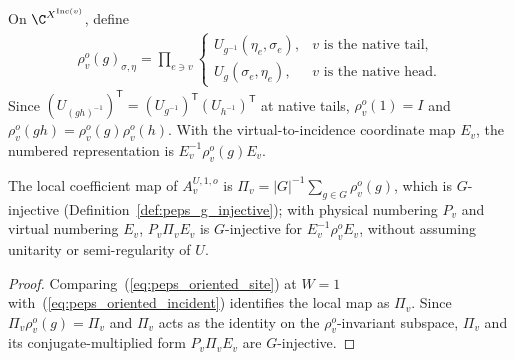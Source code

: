 \begin{definition}%
    \label{def:peps_oriented_incident_representation}
    \leanok
    On $\C^{X^{\operatorname{Inc}(v)}}$, define
    \begin{align}
        \rho_v^o(g)_{\sigma,\eta}
        =\prod_{e\ni v}
        \begin{cases}
            U_{g^{-1}}(\eta_e,\sigma_e), & v\text{ is the native tail}, \\
            U_g(\sigma_e,\eta_e),        & v\text{ is the native head}.
        \end{cases}
        \label{eq:peps_oriented_incident}
    \end{align}
    Since $(U_{(gh)^{-1}})^{\mathsf T}=(U_{g^{-1}})^{\mathsf T}(U_{h^{-1}})^{\mathsf T}$
    at native tails, $\rho_v^o(1)=I$ and $\rho_v^o(gh)=\rho_v^o(g)\rho_v^o(h)$.
    With the virtual-to-incidence coordinate map $E_v$, the numbered
    representation is $E_v^{-1}\rho_v^o(g)E_v$.
\end{definition}

\begin{lemma}%
    \label{thm:peps_oriented_average_g_injective}
    \leanok
    The local coefficient map of $A^{U,1,o}_v$ is
    $\Pi_v=|G|^{-1}\sum_{g\in G}\rho_v^o(g)$, which is $G$-injective
    (Definition~\ref{def:peps_g_injective}); with physical numbering $P_v$ and
    virtual numbering $E_v$, $P_v\Pi_v E_v$ is $G$-injective for
    $E_v^{-1}\rho_v^o E_v$, without assuming unitarity or semi-regularity of $U$.
\end{lemma}
\begin{proof}\leanok
    Comparing~(\ref{eq:peps_oriented_site}) at $W=1$ with~(\ref{eq:peps_oriented_incident})
    identifies the local map as $\Pi_v$. Since $\Pi_v\rho_v^o(g)=\Pi_v$ and
    $\Pi_v$ acts as the identity on the $\rho_v^o$-invariant subspace, $\Pi_v$
    and its conjugate-multiplied form $P_v\Pi_v E_v$ are $G$-injective.
\end{proof}

